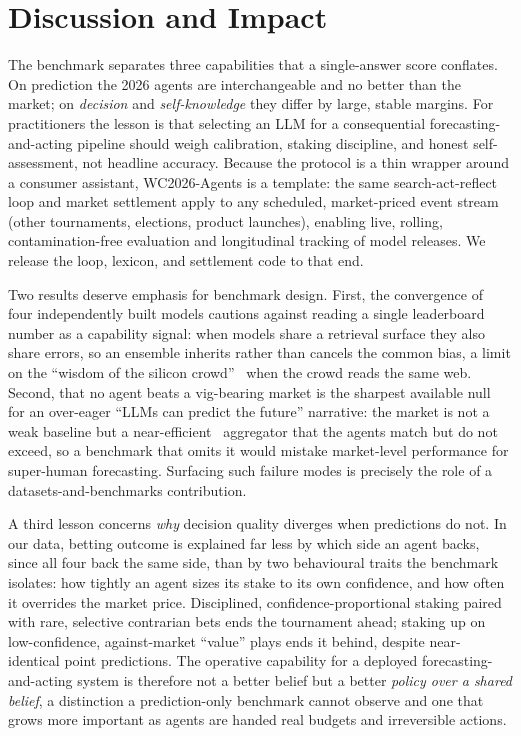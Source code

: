 \documentclass[sigconf,nonacm]{acmart}
\begin{document}
\section{Discussion and Impact}
The benchmark separates three capabilities that a single-answer score conflates.
On prediction the 2026 agents are interchangeable and no better than the market;
on \emph{decision} and \emph{self-knowledge} they differ by large, stable
margins. For practitioners the lesson is that selecting an LLM for a
consequential forecasting-and-acting pipeline should weigh calibration, staking
discipline, and honest self-assessment, not headline accuracy. Because the
protocol is a thin wrapper around a consumer assistant, WC2026-Agents is a
template: the same search-act-reflect loop and market settlement apply to any
scheduled, market-priced event stream (other tournaments, elections, product
launches), enabling live, rolling, contamination-free evaluation and longitudinal
tracking of model releases. We release the loop, lexicon, and settlement code to
that end.

Two results deserve emphasis for benchmark design. First, the convergence of
four independently built models cautions against reading a single leaderboard
number as a capability signal: when models share a retrieval surface they also
share errors, so an ensemble inherits rather than cancels the common bias, a
limit on the ``wisdom of the silicon crowd''~\cite{schoenegger2024wisdom} when
the crowd reads the same web. Second, that no agent beats a vig-bearing market is
the sharpest available null for an over-eager ``LLMs can predict the future''
narrative: the market is not a weak baseline but a
near-efficient~\cite{fama1970efficient,strumbelj2014odds} aggregator that the
agents match but do not exceed, so a benchmark that omits it would mistake
market-level performance for super-human forecasting. Surfacing such failure
modes is precisely the role of a datasets-and-benchmarks contribution.

A third lesson concerns \emph{why} decision quality diverges when predictions do
not. In our data, betting outcome is explained far less by which side an agent
backs, since all four back the same side, than by two behavioural traits the
benchmark isolates: how tightly an agent sizes its stake to its own confidence,
and how often it overrides the market price. Disciplined, confidence-proportional
staking paired with rare, selective contrarian bets ends the tournament ahead;
staking up on low-confidence, against-market ``value'' plays ends it behind,
despite near-identical point predictions. The operative capability for a deployed
forecasting-and-acting system is therefore not a better belief but a better
\emph{policy over a shared belief}, a distinction a prediction-only benchmark
cannot observe and one that grows more important as agents are handed real
budgets and irreversible actions.
\end{document}
